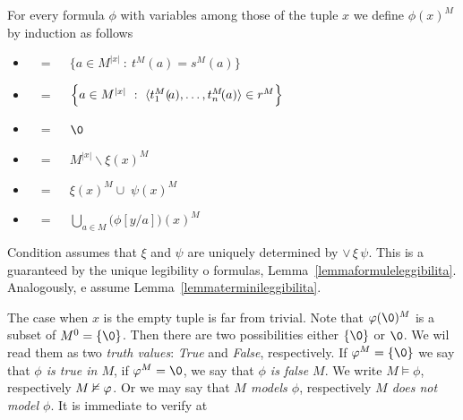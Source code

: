 \begin{definition}[of truth]\label{defverita} For every formula $\phi$ with variables among those of the tuple $x$ we define \emph{$\phi(x)^M$\/} by induction as follows
\begin{itemize}
\item[o1.] \hspace*{15ex}\ \  =\ \ \  $\Big\{a\in M^{|x|}\ :\ t^M\!(a)=s^M\!(a) \Big\}$\medskip

\item[o2.] \hspace*{15ex}\ \   =\ \ \ $\Big\{a\in M^{|x|}\ :\ \<t_1^M(\!a),\dots,t_n^M\!(a)\>\in r^M\Big\}$\medskip

\item[i0.] \hspace*{15ex}\ \  =\ \ \  $\0$\bigskip

\item[i1.] \hspace*{15ex}\ \   =\ \ \  $M^{|x|}\smallsetminus\xi(x)^M$\bigskip

\item[i2.] \hspace*{15ex}\ \   =\ \ \  $\xi(x)^M\cup\;\psi(x)^M$\bigskip

\item[i3.] \hspace*{15ex}\ \   =\ \ \ $\displaystyle\bigcup_{a\in M}\big(\phi[y/a]\big)(x)^M$
\end{itemize}
Condition  assumes that $\xi$ and $\psi$ are uniquely determined by $\vee\,\xi\,\psi$. This is a guaranteed by the unique legibility o formulas, Lemma~\ref{lemmaformuleleggibilita}. Analogously,  e  assume Lemma~\ref{lemmaterminileggibilita}. 
\end{definition}

The case when $x$ is the empty tuple is far from trivial. Note that $\phi(\0)^M$ is a subset of $M^0=\{\0\}$. Then there are two possibilities either $\{\0\}$ or $\0$. We wil read them as two \emph{truth values}: \emph{True\/} and \emph{False}, respectively. If $\phi^M=\{\0\}$ we say that \emph{$\phi$ is true in $M$}, if $\phi^M=\0$, we say that \emph{$\phi$ is false $M$}. We write \emph{$M\models\phi$}, respectively \emph{$M\nvDash\varphi$}. Or we may say that \emph{$M$ models $\phi$}, respectively \emph{$M$ does not model $\phi$}. It is immediate to verify at

